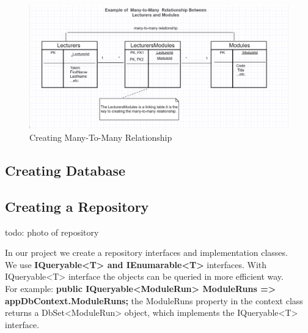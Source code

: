 \documentclass{scrartcl}
\begin{document}
\begin{figure}[H]
\centering
\includegraphics[width=150mm]{report_img/many-to-many-tables.JPG}
\caption{Creating Many-To-Many Relationship}
\label{blabla}
\end{figure}



\subsection{Creating Database}
\newpage
\subsection{Creating a Repository}

todo: photo of repository



In our project we create a repository interfaces and implementation classes.\\
We use \textbf{IQueryable<T> and IEnumarable<T>} interfaces.
With IQueryable<T> interface the objects can be queried in more efficient way.\\
For example: \textbf{public IQueryable<ModuleRun> ModuleRuns => appDbContext.ModuleRuns;} the ModuleRuns property in the context class returns a DbSet<ModuleRun> object, which implements the IQueryable<T> interface.

\noindent                                                                %
\begin{minipage}{\linewidth}                     
\end{minipage}
\end{document}
